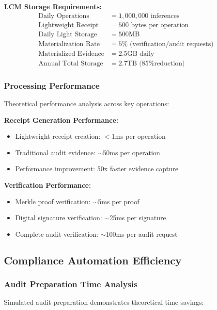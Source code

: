 \documentclass[12pt,a4paper]{article}
\begin{document}
\textbf{LCM Storage Requirements:}
\begin{align}
\text{Daily Operations} &= 1,000,000 \text{ inferences} \\
\text{Lightweight Receipt} &= 500 \text{ bytes per operation} \\
\text{Daily Light Storage} &= 500\text{MB} \\
\text{Materialization Rate} &= 5\% \text{ (verification/audit requests)} \\
\text{Materialized Evidence} &= 2.5\text{GB daily} \\
\text{Annual Total Storage} &= 2.7\text{TB (85\% reduction)}
\end{align}

\subsubsection{Processing Performance}

Theoretical performance analysis across key operations:

\textbf{Receipt Generation Performance:}
\begin{itemize}
\item Lightweight receipt creation: $<$1ms per operation
\item Traditional audit evidence: $\sim$50ms per operation
\item Performance improvement: 50x faster evidence capture
\end{itemize}

\textbf{Verification Performance:}
\begin{itemize}
\item Merkle proof verification: $\sim$5ms per proof
\item Digital signature verification: $\sim$25ms per signature
\item Complete audit verification: $\sim$100ms per audit request
\end{itemize}

\subsection{Compliance Automation Efficiency}

\subsubsection{Audit Preparation Time Analysis}

Simulated audit preparation demonstrates theoretical time savings:
\end{document}

